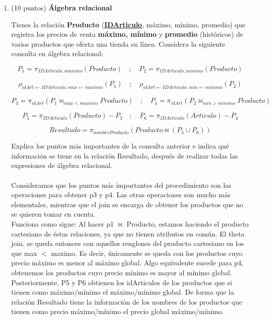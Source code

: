 \documentclass{article}
\begin{document}
\begin{enumerate}
\begin{enumerate}
        $Sirve \leftarrow  Sirve \cup (\{ Bar Tolo \} \times (s \cup \{ \text{Negra Modelo, Bohemia\}}))$
        
    \end{enumerate}
    
    \item (10 puntos) \textbf{Álgebra relacional} 
    
    Tienes la relación \textbf{Producto} (\textbf{\underline{IDArticulo}}, máximo, mínimo, promedio) que registra los precios de venta \textbf{máximo, mínimo} y \textbf{promedio} (históricos) de varios productos que oferta una tienda en línea. Considera la siguiente consulta en álgebra relacional: 
    
    $$P_{1}= \pi_{IDArticulo,maximo} (Producto)\quad;\quad P_2 = \pi_{IDArticulo,minimo}(Producto)$$
    
    $$\rho_{idArt \leftarrow IDArticulo,max \leftarrow maximo}(P_1)\quad ;\quad \rho_{idArt \leftarrow IDArticulo,min \leftarrow minimo}(P_2) $$
    
    $$P_3 = \pi_{idArt}(P_{1}\bowtie_{max<maximo} Producto)\quad ;\quad P_4 = \pi_{idArt}(P_{2} \bowtie_{min>minimo} Producto)$$
    
    $$P_5 = \pi_{IDArticulo}(Producto)-P_3 \quad ; \quad P_6 = \pi_{IDArticulo}(Articulo)-P_4$$
    
    $$Resultado = \pi_{nombreProducto}(Producto \bowtie (P_5 \cup P_6))$$
    
    Explica los puntos más importantes de la consulta anterior e indica qué información se tiene en la relación Resultado, después de realizar todas las expresiones de álgebra relacional.
    \\ \\
    Consideramos que los puntos más importantes del procedimiento son las operaciones para obtener p3 y p4. Las otras operaciones son mucho más elementales, mientras que el join se encarga de obtener los productos que no se quieren tomar en cuenta.\\
    Funciona como sigue: Al hacer p1 $\bowtie$ Producto, estamos haciendo el producto cartesiano de éstas relaciones, ya que no tienen atributos en común. El theta join, se queda entonces con aquellos renglones del producto cartesiano en los que max $<$ maximo. Es decir, únicamente se queda con los productos cuyo precio máximo es menor al máximo global. Algo equivalente sucede para p4, obtenemos los productos cuyo precio mínimo es mayor al mínimo global.
    \\
    Posteriormente, P5 y P6 obtienen los idArticulos de los productos que si tienen como máximo/mínimo el máximo/mínimo global. De forma que la relación Resultado tiene la información de los nombres de los productos que tienen como precio máximo/mínimo el precio global máximo/mínimo.


\end{enumerate}
\end{document}
